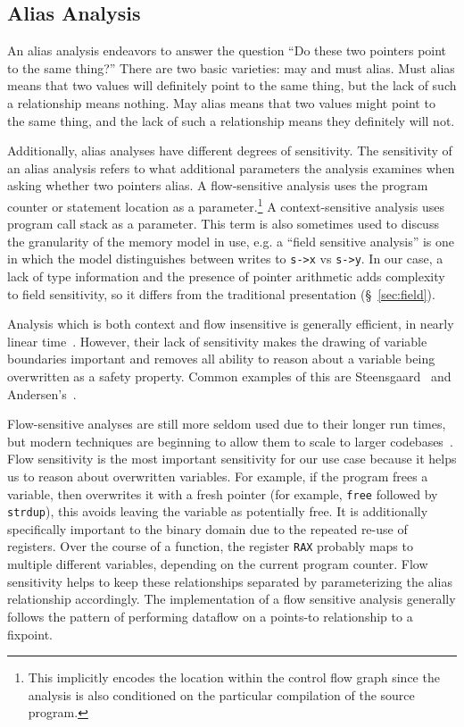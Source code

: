 \subsection{Alias Analysis}
\label{bkg:sec:alias}
An alias analysis endeavors to answer the question ``Do these two pointers point to the same thing?''
There are two basic varieties: may and must alias.
Must alias means that two values will definitely point to the same thing, but the lack of such a relationship means nothing.
May alias means that two values might point to the same thing, and the lack of such a relationship means they definitely will not.

Additionally, alias analyses have different degrees of sensitivity.
The sensitivity of an alias analysis refers to what additional parameters the analysis examines when asking whether two pointers alias.
A flow-sensitive analysis uses the program counter or statement location as a parameter.\footnote{
This implicitly encodes the location within the control flow graph since the analysis is also conditioned on the particular compilation of the source program.}
A context-sensitive analysis uses program call stack as a parameter.
This term is also sometimes used to discuss the granularity of the memory model in use, e.g. a ``field sensitive analysis'' is one in which the model distinguishes between writes to \texttt{s->x} vs \texttt{s->y}.
In our case, a lack of type information and the presence of pointer arithmetic adds complexity to field sensitivity, so it differs from the traditional presentation (\S~\ref{sec:field}).

Analysis which is both context and flow insensitive is generally efficient, in nearly linear time~\cite{steensgaard-alias}.
However, their lack of sensitivity makes the drawing of variable boundaries important and removes all ability to reason about a variable being overwritten as a safety property.
Common examples of this are Steensgaard~\cite{steensgaard-alias} and Andersen's~\cite{andersen-alias}.

Flow-sensitive analyses are still more seldom used due to their longer run times, but modern techniques are beginning to allow them to scale to larger codebases~\cite{sfs}.
Flow sensitivity is the most important sensitivity for our use case because it helps us to reason about overwritten variables.
For example, if the program frees a variable, then overwrites it with a fresh pointer (for example, \texttt{free} followed by \texttt{strdup}), this avoids leaving the variable as potentially free.
It is additionally specifically important to the binary domain due to the repeated re-use of registers.
Over the course of a function, the register \texttt{RAX} probably maps to multiple different variables, depending on the current program counter.
Flow sensitivity helps to keep these relationships separated by parameterizing the alias relationship accordingly.
The implementation of a flow sensitive analysis generally follows the pattern of performing dataflow on a points-to relationship to a fixpoint.

